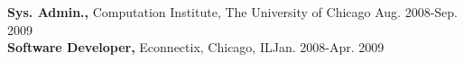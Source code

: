 \documentclass[line,overlapped]{res}
\begin{document}
\begin{resume}
\vspace{-10pt}

{\bf Sys. Admin.,} Computation Institute, The University of Chicago \hfill Aug. 2008-Sep. 2009\\
{\bf Software Developer,} Econnectix, Chicago, IL\hfill Jan. 2008-Apr. 2009\\

\end{resume}
\end{document}
